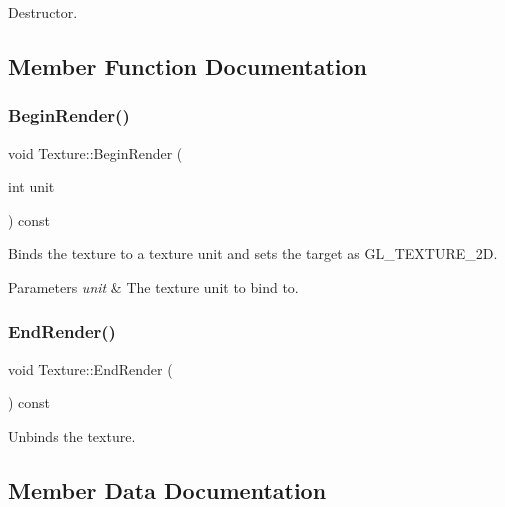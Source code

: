 Destructor. 



\subsection{Member Function Documentation}
\hypertarget{class_texture_a6c9fda62e4203d0545ec0d3d0551760d}{}\label{class_texture_a6c9fda62e4203d0545ec0d3d0551760d} 
\subsubsection{\texorpdfstring{Begin\+Render()}{BeginRender()}}
{\footnotesize\ttfamily void Texture\+::\+Begin\+Render (\begin{DoxyParamCaption}\item[{int}]{unit }\end{DoxyParamCaption}) const\hspace{0.3cm}{\ttfamily [virtual]}}



Binds the texture to a texture unit and sets the target as G\+L\+\_\+\+T\+E\+X\+T\+U\+R\+E\+\_\+2D. 


\begin{DoxyParams}{Parameters}
{\em unit} & The texture unit to bind to. \\
\hline
\end{DoxyParams}
\hypertarget{class_texture_ab3fc771da58d58e1f3701b1fae12880b}{}\label{class_texture_ab3fc771da58d58e1f3701b1fae12880b} 
\subsubsection{\texorpdfstring{End\+Render()}{EndRender()}}
{\footnotesize\ttfamily void Texture\+::\+End\+Render (\begin{DoxyParamCaption}{ }\end{DoxyParamCaption}) const\hspace{0.3cm}{\ttfamily [virtual]}}



Unbinds the texture. 



\subsection{Member Data Documentation}
\hypertarget{class_texture_adbf320788255a426a0a60e35cd969bcd}{}\label{class_texture_adbf320788255a426a0a60e35cd969bcd} 
